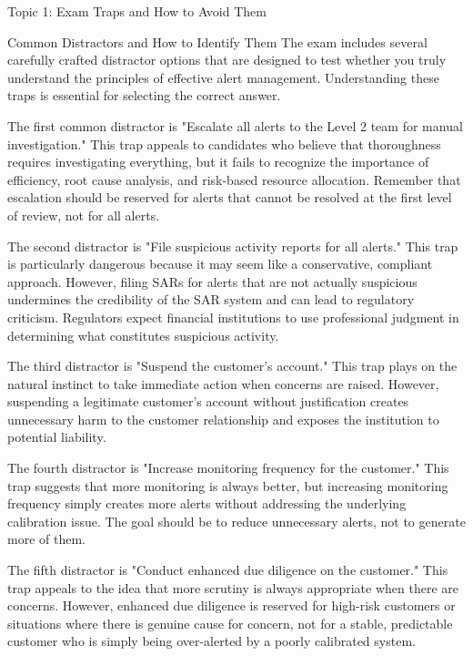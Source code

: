 \documentclass[8pt]{beamer}  %
\newcommand{\warning}{\textcolor{warningorange}{\ding{43}}}
\begin{document}
	\begin{frame}{Topic 1: Exam Traps and How to Avoid Them}
		\begin{block}{\large \warning Common Distractors and How to Identify Them}
			The exam includes several carefully crafted distractor options that are designed to test whether you truly understand the principles of effective alert management. Understanding these traps is essential for selecting the correct answer.
			
			The first common distractor is "Escalate all alerts to the Level 2 team for manual investigation." This trap appeals to candidates who believe that thoroughness requires investigating everything, but it fails to recognize the importance of efficiency, root cause analysis, and risk-based resource allocation. Remember that escalation should be reserved for alerts that cannot be resolved at the first level of review, not for all alerts.
			
			The second distractor is "File suspicious activity reports for all alerts." This trap is particularly dangerous because it may seem like a conservative, compliant approach. However, filing SARs for alerts that are not actually suspicious undermines the credibility of the SAR system and can lead to regulatory criticism. Regulators expect financial institutions to use professional judgment in determining what constitutes suspicious activity.
			
			The third distractor is "Suspend the customer's account." This trap plays on the natural instinct to take immediate action when concerns are raised. However, suspending a legitimate customer's account without justification creates unnecessary harm to the customer relationship and exposes the institution to potential liability.
			
			The fourth distractor is "Increase monitoring frequency for the customer." This trap suggests that more monitoring is always better, but increasing monitoring frequency simply creates more alerts without addressing the underlying calibration issue. The goal should be to reduce unnecessary alerts, not to generate more of them.
			
			The fifth distractor is "Conduct enhanced due diligence on the customer." This trap appeals to the idea that more scrutiny is always appropriate when there are concerns. However, enhanced due diligence is reserved for high-risk customers or situations where there is genuine cause for concern, not for a stable, predictable customer who is simply being over-alerted by a poorly calibrated system.
		\end{block}
		

\end{frame}
\end{document}
